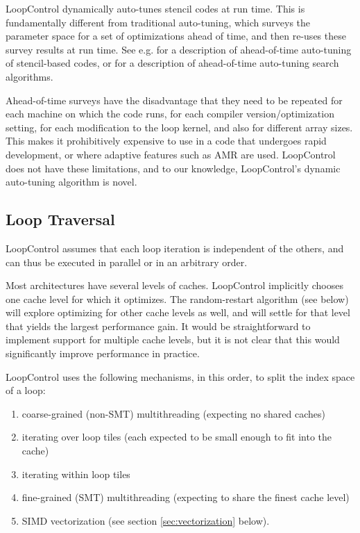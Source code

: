 \documentclass[conference]{IEEEtran}
\begin{document}
LoopControl dynamically auto-tunes stencil codes at run time. This is
fundamentally different from traditional auto-tuning, which surveys
the parameter space for a set of optimizations ahead of time, and then
re-uses these survey results at run time. See e.g. \cite{Datta2008}
for a description of ahead-of-time auto-tuning of stencil-based codes, or
\cite{Balaprakasha2011} for a description of ahead-of-time
auto-tuning search algorithms.

Ahead-of-time surveys have the disadvantage that they need to be
repeated for each machine on which the code runs, for each compiler
version/optimization setting, for each modification to the loop
kernel, and also for different array sizes. This makes it prohibitively
expensive to use in a code that undergoes rapid development, or where
adaptive features such as AMR are used. LoopControl does not have
these limitations, and to our knowledge, LoopControl's dynamic
auto-tuning algorithm is novel.

\subsection{Loop Traversal}

LoopControl assumes that each loop iteration is independent of the
others, and can thus be executed in parallel or in an arbitrary order.


Most architectures have several levels of caches. LoopControl
implicitly chooses one cache level for which it optimizes. The
random-restart algorithm (see below) will explore optimizing for other cache
levels as well, and will settle for that level that yields the largest
performance gain. It would be straightforward to implement support for
multiple cache levels, but it is not clear that this would
significantly improve
performance in practice.

LoopControl uses the following mechanisms, in this order, to split the
index space of a loop:
\begin{enumerate}
\item coarse-grained (non-SMT) multithreading (expecting no shared
  caches)
\item iterating over loop tiles (each expected to be small enough to
  fit into the cache)
\item iterating within loop tiles
\item fine-grained (SMT) multithreading (expecting to share the finest
  cache level)
\item SIMD vectorization (see section \ref{sec:vectorization} below).
\end{enumerate}
\end{document}

